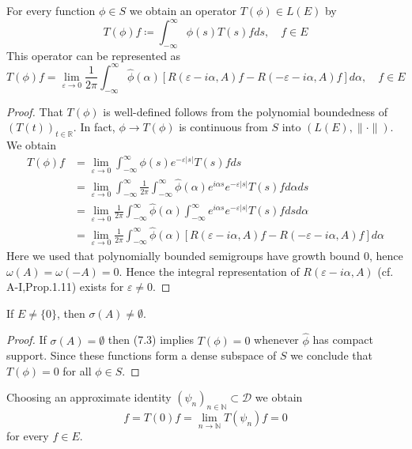 \begin{lemma}\label{lem:a3-7.5}
	For every function $\phi \in S$ we obtain an operator $T(\phi) \in L(E)$ by
	\[
	T(\phi)f \coloneqq \int_{-\infty}^{\infty} \phi(s)T(s)f ds, \quad f \in E
	\]
	This operator can be represented as
	\begin{equation}\label{eq:a3-7.3}
		T(\phi)f = \lim_{\varepsilon\to 0} \frac{1}{2\pi}\int_{-\infty}^{\infty} \hat{\phi}(\alpha)[R(\varepsilon-i\alpha,A)f - R(-\varepsilon-i\alpha,A)f] d\alpha, \quad f \in E
	\end{equation}
\end{lemma}
\begin{proof}
	That $T(\phi)$ is well-defined follows from the polynomial boundedness of $(T(t))_{t\in\mathbb{R}}$.
	In fact, $\phi \to T(\phi)$ is continuous from $S$ into $(L(E),\|\cdot\|)$.
	We obtain
	\begin{align*}
		T(\phi)f &= \lim_{\varepsilon\to 0} \int_{-\infty}^{\infty} \phi(s)e^{-\varepsilon|s|}T(s)f ds \\
		&= \lim_{\varepsilon\to 0} \int_{-\infty}^{\infty} \frac{1}{2\pi}\int_{-\infty}^{\infty} \hat{\phi}(\alpha)e^{i\alpha s}e^{-\varepsilon|s|}T(s)f d\alpha ds \\
		&= \lim_{\varepsilon\to 0} \frac{1}{2\pi}\int_{-\infty}^{\infty} \hat{\phi}(\alpha)\int_{-\infty}^{\infty} e^{i\alpha s}e^{-\varepsilon|s|}T(s)f ds d\alpha \\
		&= \lim_{\varepsilon\to 0} \frac{1}{2\pi}\int_{-\infty}^{\infty} \hat{\phi}(\alpha)[R(\varepsilon-i\alpha,A)f - R(-\varepsilon-i\alpha,A)f] d\alpha
	\end{align*}
	Here we used that polynomially bounded semigroups have growth bound $0$, hence $\omega(A) = \omega(-A) = 0$.
	Hence the integral representation of $R(\varepsilon-i\alpha,A)$ (cf. A-I,Prop.1.11) exists for $\varepsilon \neq 0$.
\end{proof}

\begin{lemma}\label{lem:a3-7.6}
	If $E \neq \{0\}$, then $\sigma(A) \neq \emptyset$.
\end{lemma}

\begin{proof}
	If $\sigma(A) = \emptyset$ then (7.3) implies $T(\phi) = 0$ whenever $\hat{\phi}$ has compact support.
	Since these functions form a dense subspace of $S$ we conclude that $T(\phi) = 0$ for all $\phi \in S$.
\end{proof}


\newpage
Choosing an approximate identity $(\psi_{n})_{n\in\mathbb{N}} \subset \mathcal{D}$ we obtain
\[
f = T(0)f = \lim_{n\to\mathbb{N}} T(\psi_{n})f = 0
\]
for every $f \in E$.

